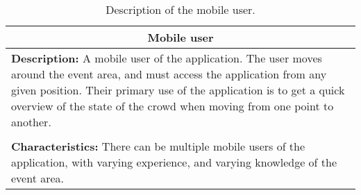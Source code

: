 \begin{table}[htbp]
    \centering
    \begin{tabularx}{/4}{X}
        \toprule
        \multicolumn{1}{c}{\textbf{Mobile user}} \\ 
        \midrule
        \textbf{Description:} A mobile user of the application. The user moves around the event area, and must access the application from any given position. Their primary use of the application is to get a quick overview of the state of the crowd when moving from one point to another. \\
        \\
        \textbf{Characteristics:} There can be multiple mobile users of the application, with varying experience, and varying knowledge of the event area. \\
        \bottomrule
    \end{tabularx}
    \caption{Description of the mobile user.}
    \label{tab:mob_user}
\end{table}